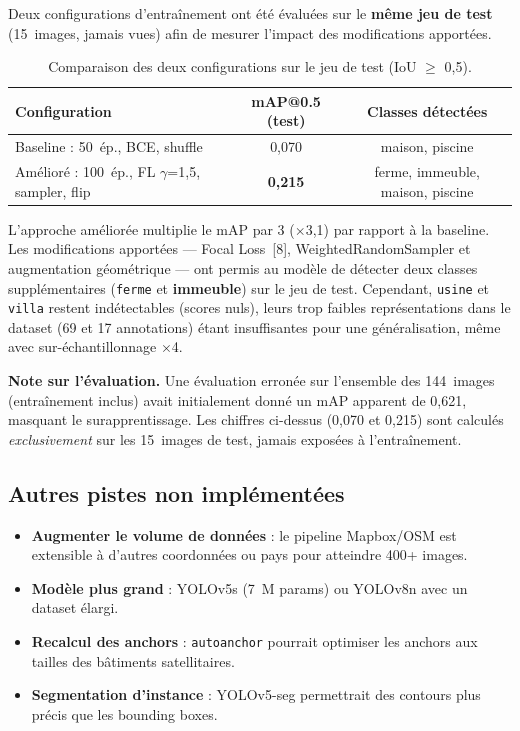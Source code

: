\documentclass[12pt,a4paper]{article}
\begin{document}
Deux configurations d'entraînement ont été évaluées sur le \textbf{même jeu de test} (15~images, jamais vues) afin de mesurer l'impact des modifications apportées.

\begin{table}[H]
\centering
\begin{tabularx}{\linewidth}{>{\raggedright\arraybackslash}X c c}
\toprule
\textbf{Configuration} & \textbf{mAP@0.5 (test)} & \textbf{Classes détectées} \\
\midrule
Baseline : 50~ép., BCE, shuffle & 0,070 & maison, piscine \\
Amélioré : 100~ép., FL $\gamma$=1,5, sampler, flip & \textbf{0,215} & ferme, immeuble, maison, piscine \\
\bottomrule
\end{tabularx}
\caption{Comparaison des deux configurations sur le jeu de test (IoU $\geq$ 0,5).}
\label{tab:compare}
\end{table}

L'approche améliorée multiplie le mAP par 3 ($\times$3,1) par rapport à la baseline. Les modifications apportées --- Focal Loss~[8], WeightedRandomSampler et augmentation géométrique --- ont permis au modèle de détecter deux classes supplémentaires (\texttt{ferme} et \textbf{immeuble}) sur le jeu de test. Cependant, \texttt{usine} et \texttt{villa} restent indétectables (scores nuls), leurs trop faibles représentations dans le dataset (69 et 17 annotations) étant insuffisantes pour une généralisation, même avec sur-échantillonnage $\times$4.

\noindent\textbf{Note sur l'évaluation.} Une évaluation erronée sur l'ensemble des 144~images (entraînement inclus) avait initialement donné un mAP apparent de 0,621, masquant le surapprentissage. Les chiffres ci-dessus (0,070 et 0,215) sont calculés \emph{exclusivement} sur les 15~images de test, jamais exposées à l'entraînement.

\subsection{Autres pistes non implémentées}

\begin{itemize}
    \item \textbf{Augmenter le volume de données} : le pipeline Mapbox/OSM est extensible à d'autres coordonnées ou pays pour atteindre 400+ images.
    \item \textbf{Modèle plus grand} : YOLOv5s (7~M params) ou YOLOv8n avec un dataset élargi.
    \item \textbf{Recalcul des anchors} : \texttt{autoanchor} pourrait optimiser les anchors aux tailles des bâtiments satellitaires.
    \item \textbf{Segmentation d'instance} : YOLOv5-seg permettrait des contours plus précis que les bounding boxes.
\end{itemize}
\end{document}
